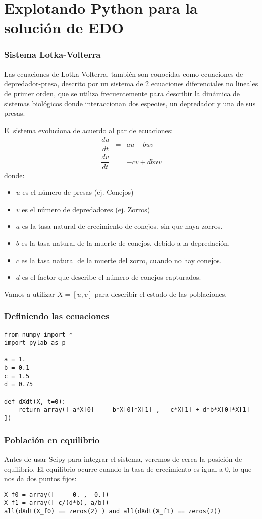\section{Explotando Python para la solución de EDO}
\begin{frame}
\frametitle{Sistema Lotka-Volterra}
Las ecuaciones de Lotka-Volterra, también son conocidas como ecuaciones de depredador-presa, descrito por un sistema de 2 ecuaciones diferenciales no lineales de primer orden, que se utiliza frecuentemente para describir la dinámica de sistemas biológicos donde interaccionan dos especies, un depredador y una de sus presas.
\end{frame}
\begin{frame}
El sistema evoluciona de acuerdo al par de ecuaciones:
\begin{eqnarray*}
\dfrac{du}{dt} &=& au - buv \\
\dfrac{dv}{dt} &=& -cv + dbuv
\end{eqnarray*}
donde:
\fontsize{12}{12}\selectfont
\begin{itemize}
\item $u$ es el número de presas (ej. Conejos)
\item $v$ es el número de depredadores (ej. Zorros)
\item $a$ es la tasa natural de crecimiento de conejos, sin que haya zorros.
\item $b$ es la tasa natural de la muerte de conejos, debido a la depredación.
\item $c$ es la tasa natural de la muerte del zorro, cuando no hay conejos.
\item $d$ es el factor que describe el número de conejos capturados.
\end{itemize}
\end{frame}
\begin{frame}
Vamos a utilizar $X = [u, v]$ para describir el estado de las poblaciones.
\end{frame}
\begin{frame}[fragile]
\frametitle{Definiendo las ecuaciones}
\begin{lstlisting}
from numpy import *
import pylab as p

a = 1.
b = 0.1
c = 1.5
d = 0.75

def dXdt(X, t=0):
    return array([ a*X[0] -   b*X[0]*X[1] ,  -c*X[1] + d*b*X[0]*X[1] ])
\end{lstlisting}
\end{frame}
\begin{frame}[fragile]
\frametitle{Población en equilibrio}
Antes de usar Scipy para integrar el sistema, veremos de cerca la posición de equilibrio. El equilibrio ocurre cuando la tasa de crecimiento es igual a 0, lo que nos da dos puntos fijos:
\begin{lstlisting}
X_f0 = array([     0. ,  0.])
X_f1 = array([ c/(d*b), a/b])
all(dXdt(X_f0) == zeros(2) ) and all(dXdt(X_f1) == zeros(2))
\end{lstlisting}
\end{frame}
